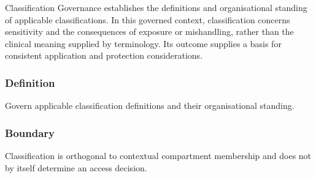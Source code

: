 Classification Governance establishes the definitions and organisational standing of applicable classifications. In this governed context, classification concerns sensitivity and the consequences of exposure or mishandling, rather than the clinical meaning supplied by terminology. Its outcome supplies a basis for consistent application and protection considerations.

\subsubsection*{Definition}

Govern applicable classification definitions and their organisational standing.

\subsubsection*{Boundary}

Classification is orthogonal to contextual compartment membership and does not by itself determine an access decision.

